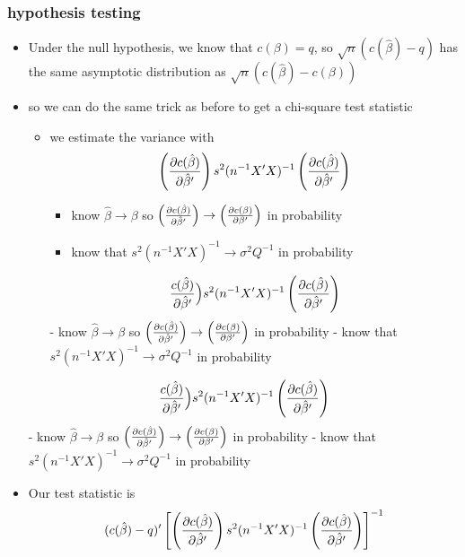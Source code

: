 \documentclass[11pt]{article}
\begin{document}
\subsubsection{hypothesis testing}
\label{sec-3-2-3}

\begin{itemize}
\item Under the null hypothesis, we know that $c(\beta) = q$, so
        $\sqrt{n}(c(\hat\beta) - q)$ has the same asymptotic
        distribution as $\sqrt{n}(c(\hat\beta) - c(\beta))$
\item so we can do the same trick as before to get a chi-square test
        statistic
\begin{itemize}
\item we estimate the variance with \[ \left({\partial
        c(\hat\beta) \over \partial \hat\beta'}\right)s^2 (n^{-1}X'X)^{-1}
        \left({\partial c(\hat\beta) \over \partial \hat\beta'}\right)\]
\begin{itemize}
\item know $\hat\beta \to \beta$ so $\left({\partial c(\hat\beta)
            \over \partial \hat\beta'}\right) \to \left({\partial
            c(\beta) \over \partial \beta'}\right)$ in probability
\item know that $s^2 (n^{-1} X'X)^{-1} \to \sigma^2Q^{-1}$ in
            probability
\end{itemize}
\[{c(\hat\beta) \over \partial \hat\beta'}\Big)s^2 (n^{-1}X'X)^{-1}
        \left({\partial c(\hat\beta) \over \partial \hat\beta'}\right)\]
          - know $\hat\beta \to \beta$ so $\left({\partial c(\hat\beta)
            \over \partial \hat\beta'}\right) \to \left({\partial
            c(\beta) \over \partial \beta'}\right)$ in probability
          - know that $s^2 (n^{-1} X'X)^{-1} \to \sigma^2Q^{-1}$ in
            probability
\end{itemize}
\[{c(\hat\beta) \over \partial \hat\beta'}\Big)s^2 (n^{-1}X'X)^{-1}
        \left({\partial c(\hat\beta) \over \partial \hat\beta'}\right)\]
          - know $\hat\beta \to \beta$ so $\left({\partial c(\hat\beta)
            \over \partial \hat\beta'}\right) \to \left({\partial
            c(\beta) \over \partial \beta'}\right)$ in probability
          - know that $s^2 (n^{-1} X'X)^{-1} \to \sigma^2Q^{-1}$ in
            probability
\item Our test statistic is 
        \[ (c(\hat\beta) - q)' \left[\left({\partial
        c(\hat\beta) \over \partial \hat\beta'}\right)s^2 (n^{-1}X'X)^{-1}
        \left({\partial c(\hat\beta) \over \partial \hat\beta'}\right) \right]^{-1}
\]
\end{itemize}
\end{document}
